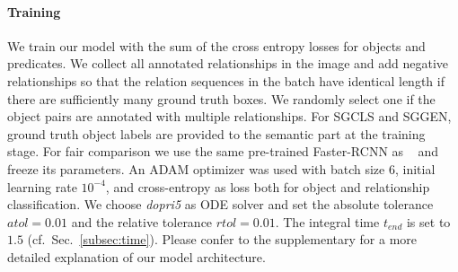 \documentclass[runningheads]{llncs}
\begin{document}
\paragraph{Training}
We train our model with the sum of the cross entropy losses for objects and predicates. We collect all annotated relationships in the image and add negative relationships so that the relation sequences in the batch have identical length  if there are sufficiently many ground truth boxes. We randomly select one if the object pairs are annotated with multiple relationships. For SGCLS and SGGEN, ground truth object labels are provided to the semantic part at the training stage. For fair comparison we use the same pre-trained Faster-RCNN as ~\cite{zellers2018neural} and freeze its parameters. An ADAM optimizer was used with batch size $6$, initial learning rate $10^{-4}$, and cross-entropy as loss both for object and relationship classification. 
We choose \emph{dopri5} as ODE solver and set the absolute tolerance $atol=0.01$ and the relative tolerance $rtol=0.01$. The integral time $t_{end}$ is set to $1.5$ (cf.~Sec.~\ref{subsec:time}). 
Please confer to the supplementary for a more detailed explanation of our model architecture.
\end{document}
